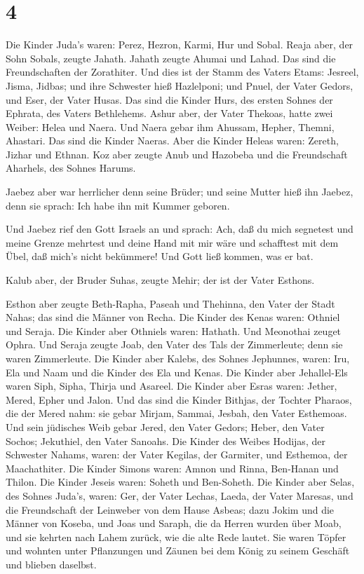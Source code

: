 \hypertarget{section-3}{%
\section{4}\label{section-3}}

 Die Kinder Juda's waren: Perez, Hezron, Karmi, Hur und
Sobal.  Reaja aber, der Sohn Sobals, zeugte Jahath. Jahath
zeugte Ahumai und Lahad. Das sind die Freundschaften der Zorathiter.
 Und dies ist der Stamm des Vaters Etams: Jesreel, Jisma,
Jidbas; und ihre Schwester hieß Hazlelponi;  und Pnuel, der
Vater Gedors, und Eser, der Vater Husas. Das sind die Kinder Hurs, des
ersten Sohnes der Ephrata, des Vaters Bethlehems.  Ashur
aber, der Vater Thekoas, hatte zwei Weiber: Helea und Naera.
 Und Naera gebar ihm Ahussam, Hepher, Themni, Ahastari. Das
sind die Kinder Naeras.  Aber die Kinder Heleas waren:
Zereth, Jizhar und Ethnan.  Koz aber zeugte Anub und
Hazobeba und die Freundschaft Aharhels, des Sohnes Harums.

 Jaebez aber war herrlicher denn seine Brüder; und seine
Mutter hieß ihn Jaebez, denn sie sprach: Ich habe ihn mit Kummer
geboren.

 Und Jaebez rief den Gott Israels an und sprach: Ach, daß
du mich segnetest und meine Grenze mehrtest und deine Hand mit mir wäre
und schafftest mit dem Übel, daß mich's nicht bekümmere! Und Gott ließ
kommen, was er bat.

 Kalub aber, der Bruder Suhas, zeugte Mehir; der ist der
Vater Esthons.

 Esthon aber zeugte Beth-Rapha, Paseah und Thehinna, den
Vater der Stadt Nahas; das sind die Männer von Recha.  Die
Kinder des Kenas waren: Othniel und Seraja. Die Kinder aber Othniels
waren: Hathath.  Und Meonothai zeuget Ophra. Und Seraja
zeugte Joab, den Vater des Tals der Zimmerleute; denn sie waren
Zimmerleute.  Die Kinder aber Kalebs, des Sohnes Jephunnes,
waren: Iru, Ela und Naam und die Kinder des Ela und Kenas. 
Die Kinder aber Jehallel-Els waren Siph, Sipha, Thirja und Asareel.
 Die Kinder aber Esras waren: Jether, Mered, Epher und
Jalon. Und das sind die Kinder Bithjas, der Tochter Pharaos, die der
Mered nahm: sie gebar Mirjam, Sammai, Jesbah, den Vater Esthemoas.
 Und sein jüdisches Weib gebar Jered, den Vater Gedors;
Heber, den Vater Sochos; Jekuthiel, den Vater Sanoahs.  Die
Kinder des Weibes Hodijas, der Schwester Nahams, waren: der Vater
Kegilas, der Garmiter, und Esthemoa, der Maachathiter.  Die
Kinder Simons waren: Amnon und Rinna, Ben-Hanan und Thilon. Die Kinder
Jeseis waren: Soheth und Ben-Soheth.  Die Kinder aber
Selas, des Sohnes Juda's, waren: Ger, der Vater Lechas, Laeda, der Vater
Maresas, und die Freundschaft der Leinweber von dem Hause Asbeas;
 dazu Jokim und die Männer von Koseba, und Joas und Saraph,
die da Herren wurden über Moab, und sie kehrten nach Lahem zurück, wie
die alte Rede lautet.  Sie waren Töpfer und wohnten unter
Pflanzungen und Zäunen bei dem König zu seinem Geschäft und blieben
daselbst.

